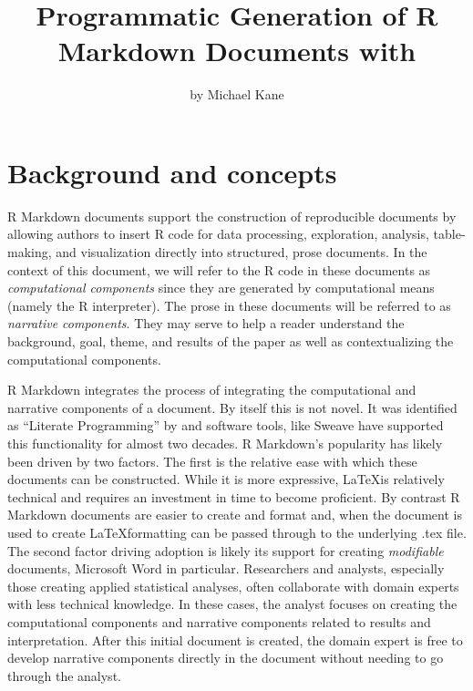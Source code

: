 \title{Programmatic Generation of R Markdown Documents with
}
\author{by Michael Kane}

\maketitle


\hypertarget{background-and-concepts}{%
\section{Background and concepts}\label{background-and-concepts}}

R Markdown documents support the construction of reproducible documents
by allowing authors to insert R code for data processing, exploration,
analysis, table-making, and visualization directly into structured,
prose documents. In the context of this document, we will refer to the R
code in these documents as \emph{computational components} since they
are generated by computational means (namely the R interpreter). The
prose in these documents will be referred to as \emph{narrative
components}. They may serve to help a reader understand the background,
goal, theme, and results of the paper as well as contextualizing the
computational components.

R Markdown \citep{baumer2014} integrates the process of integrating the
computational and narrative components of a document. By itself this is
not novel. It was identified as ``Literate Programming'' by
\citet{knuth1984} and software tools, like Sweave \citep{leisch2002}
have supported this functionality for almost two decades. R Markdown's
popularity has likely been driven by two factors. The first is the
relative ease with which these documents can be constructed. While it is
more expressive, \LaTeX is relatively technical and requires an
investment in time to become proficient. By contrast R Markdown
documents are easier to create and format and, when the document is used
to create \LaTeX formatting can be passed through to the underlying .tex
file. The second factor driving adoption is likely its support for
creating \emph{modifiable} documents, Microsoft Word in particular.
Researchers and analysts, especially those creating applied statistical
analyses, often collaborate with domain experts with less technical
knowledge. In these cases, the analyst focuses on creating the
computational components and narrative components related to results and
interpretation. After this initial document is created, the domain
expert is free to develop narrative components directly in the document
without needing to go through the analyst.

